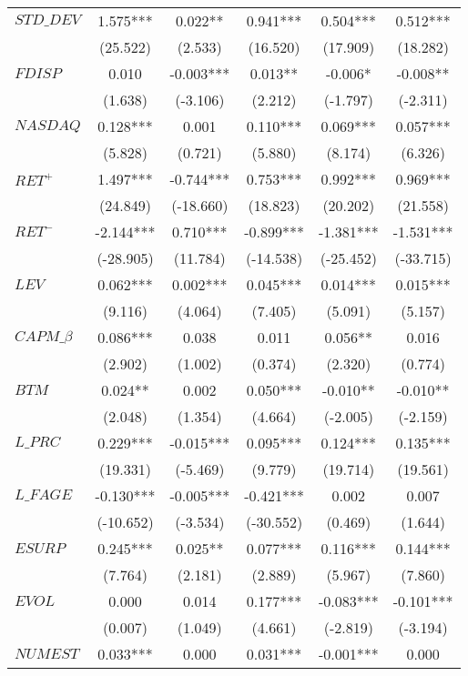 \begin{xltabular}{\linewidth}{X * {5}{S[table-format=4.3]}}
\endfoot
\bottomrule
\endlastfoot
$STD\_DEV$ & 1.575*** & 0.022** & 0.941*** & 0.504*** & 0.512***\\
 & (25.522) & (2.533) & (16.520) & (17.909) & (18.282)\\
\addlinespace
$FDISP$ & 0.010 & -0.003*** & 0.013** & -0.006* & -0.008**\\
 & (1.638) & (-3.106) & (2.212) & (-1.797) & (-2.311)\\
\addlinespace
$NASDAQ$ & 0.128*** & 0.001 & 0.110*** & 0.069*** & 0.057***\\
 & (5.828) & (0.721) & (5.880) & (8.174) & (6.326)\\
\addlinespace
$RET^+$ & 1.497*** & -0.744*** & 0.753*** & 0.992*** & 0.969***\\
 & (24.849) & (-18.660) & (18.823) & (20.202) & (21.558)\\
\addlinespace
$RET^-$ & -2.144*** & 0.710*** & -0.899*** & -1.381*** & -1.531***\\
 & (-28.905) & (11.784) & (-14.538) & (-25.452) & (-33.715)\\
\addlinespace
$LEV$ & 0.062*** & 0.002*** & 0.045*** & 0.014*** & 0.015***\\
 & (9.116) & (4.064) & (7.405) & (5.091) & (5.157)\\
\addlinespace
$CAPM\_\beta$ & 0.086*** & 0.038 & 0.011 & 0.056** & 0.016\\
 & (2.902) & (1.002) & (0.374) & (2.320) & (0.774)\\
\addlinespace
$BTM$ & 0.024** & 0.002 & 0.050*** & -0.010** & -0.010**\\
 & (2.048) & (1.354) & (4.664) & (-2.005) & (-2.159)\\
\addlinespace
$L\_PRC$ & 0.229*** & -0.015*** & 0.095*** & 0.124*** & 0.135***\\
 & (19.331) & (-5.469) & (9.779) & (19.714) & (19.561)\\
\addlinespace
$L\_FAGE$ & -0.130*** & -0.005*** & -0.421*** & 0.002 & 0.007\\
 & (-10.652) & (-3.534) & (-30.552) & (0.469) & (1.644)\\
\addlinespace
$ESURP$ & 0.245*** & 0.025** & 0.077*** & 0.116*** & 0.144***\\
 & (7.764) & (2.181) & (2.889) & (5.967) & (7.860)\\
\addlinespace
$EVOL$ & 0.000 & 0.014 & 0.177*** & -0.083*** & -0.101***\\
 & (0.007) & (1.049) & (4.661) & (-2.819) & (-3.194)\\
\addlinespace
$NUMEST$ & 0.033*** & 0.000 & 0.031*** & -0.001*** & 0.000\\

\end{xltabular}
